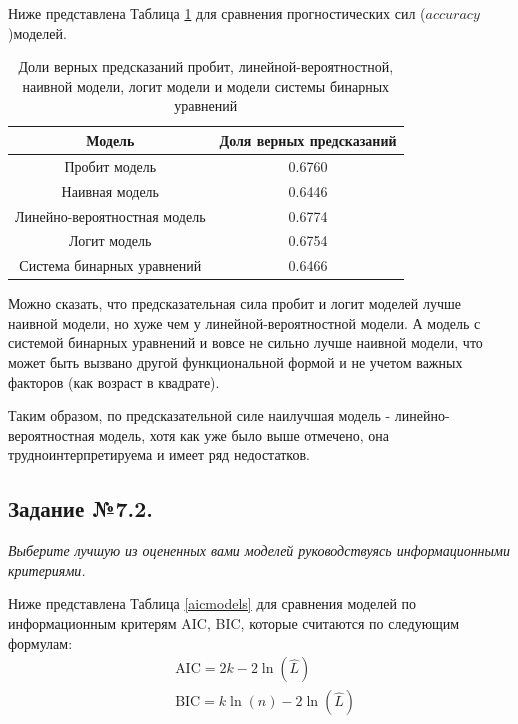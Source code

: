 \documentclass[a4paper,12pt]{article}
\begin{document}
	\vspace{0.2cm}
	
	Ниже представлена Таблица \ref{accuracymodels} для сравнения прогностических сил ($accuracy$)моделей.
	
		\begin{table}[!h]
		\caption{Доли верных предсказаний пробит, линейной-вероятностной, наивной модели, логит модели и модели системы бинарных уравнений}
		\label{accuracymodels}
		\centering
		\begin{tabular}{|c|c|}
			\hline
			Модель  &  Доля верных предсказаний  \\ 
			\hline
			Пробит модель& 0.6760\\
			\hline
			Наивная модель & 0.6446\\
			\hline
			Линейно-вероятностная модель &0.6774	\\		
			\hline
			Логит модель&0.6754	\\	
			\hline
			Система бинарных уравнений&0.6466	\\	
			\hline
		\end{tabular}
	\end{table}

	Можно сказать, что предсказательная сила пробит и логит моделей лучше наивной модели, но хуже чем у линейной-вероятностной модели. А модель с системой бинарных уравнений и вовсе не сильно лучше наивной модели, что может быть вызвано другой функциональной формой и не учетом важных факторов (как возраст в квадрате). 
	
	Таким образом, по предсказательной силе наилучшая модель - линейно-вероятностная модель, хотя как уже было выше отмечено, она трудноинтерпретируема и имеет ряд недостатков.

	
		\subsection{Задание №7.2.}
		\textit{
	Выберите лучшую из оцененных вами моделей руководствуясь информационными критериями. }

	\vspace{0.2cm}
	
	Ниже представлена Таблица \ref{aicmodels} для сравнения моделей по информационным критерям AIC, BIC, которые считаются по следующим формулам:
	\begin{align*}
		& \text{AIC} = 2k - 2\ln (\hat L) \\
		& \text{BIC} = k \ln (n) - 2\ln (\hat L)
	\end{align*}
\end{document}
